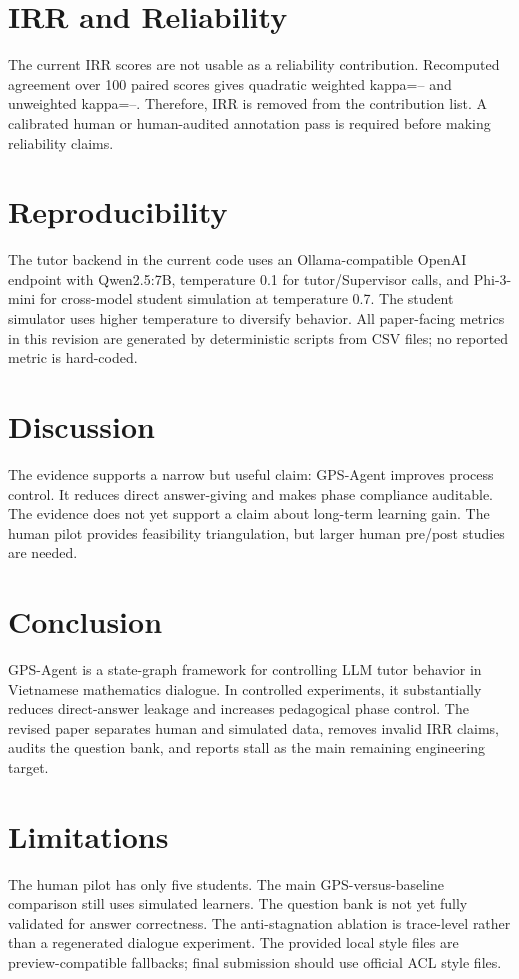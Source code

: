 \documentclass[11pt]{article}
\begin{document}
\section{IRR and Reliability}
The current IRR scores are not usable as a reliability contribution. Recomputed agreement over 100 paired scores gives quadratic weighted kappa=-- and unweighted kappa=--. Therefore, IRR is removed from the contribution list. A calibrated human or human-audited annotation pass is required before making reliability claims.

\section{Reproducibility}
The tutor backend in the current code uses an Ollama-compatible OpenAI endpoint with Qwen2.5:7B, temperature 0.1 for tutor/Supervisor calls, and Phi-3-mini for cross-model student simulation at temperature 0.7. The student simulator uses higher temperature to diversify behavior. All paper-facing metrics in this revision are generated by deterministic scripts from CSV files; no reported metric is hard-coded.

\section{Discussion}
The evidence supports a narrow but useful claim: GPS-Agent improves process control. It reduces direct answer-giving and makes phase compliance auditable. The evidence does not yet support a claim about long-term learning gain. The human pilot provides feasibility triangulation, but larger human pre/post studies are needed.

\section{Conclusion}
GPS-Agent is a state-graph framework for controlling LLM tutor behavior in Vietnamese mathematics dialogue. In controlled experiments, it substantially reduces direct-answer leakage and increases pedagogical phase control. The revised paper separates human and simulated data, removes invalid IRR claims, audits the question bank, and reports stall as the main remaining engineering target.

\section{Limitations}
The human pilot has only five students. The main GPS-versus-baseline comparison still uses simulated learners. The question bank is not yet fully validated for answer correctness. The anti-stagnation ablation is trace-level rather than a regenerated dialogue experiment. The provided local style files are preview-compatible fallbacks; final submission should use official ACL style files.
\end{document}
